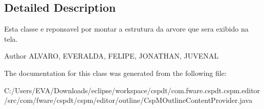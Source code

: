 \subsection{Detailed Description}
Esta classe e reponsavel por montar a estrutura da arvore que sera exibido na tela. 

\begin{DoxyAuthor}{Author}
A\+L\+V\+A\+RO, E\+V\+E\+R\+A\+L\+DA, F\+E\+L\+I\+PE, J\+O\+N\+A\+T\+H\+AN, J\+U\+V\+E\+N\+AL 
\end{DoxyAuthor}


The documentation for this class was generated from the following file\+:\begin{DoxyCompactItemize}
\item 
C\+:/\+Users/\+E\+V\+A/\+Downloads/eclipse/workspace/cspdt/com.\+fware.\+cspdt.\+cspm.\+editor/src/com/fware/cspdt/cspm/editor/outline/Csp\+M\+Outline\+Content\+Provider.\+java\end{DoxyCompactItemize}
